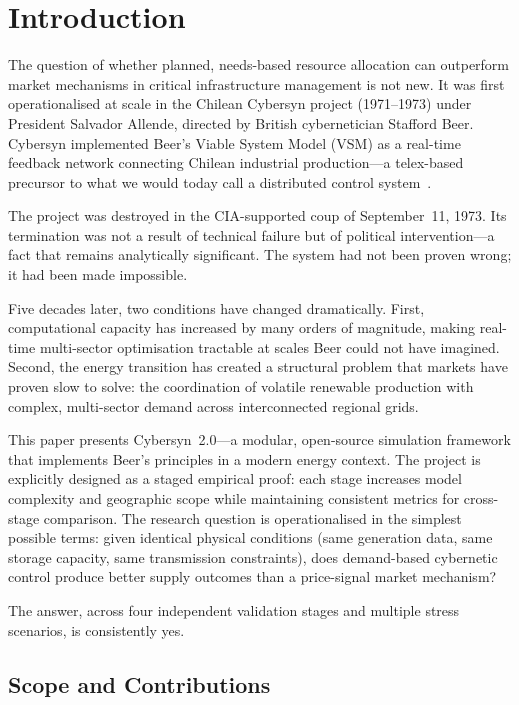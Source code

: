 \documentclass[12pt]{article}
\begin{document}
\section{Introduction}

The question of whether planned, needs-based resource allocation can outperform
market mechanisms in critical infrastructure management is not new.
It was first operationalised at scale in the Chilean Cybersyn project (1971--1973)
under President Salvador Allende, directed by British cybernetician Stafford Beer.
Cybersyn implemented Beer's Viable System Model (VSM) as a real-time feedback network
connecting Chilean industrial production---a telex-based precursor to what we would
today call a distributed control system~\citep{beer1972brain}.

The project was destroyed in the CIA-supported coup of September~11, 1973.
Its termination was not a result of technical failure but of political
intervention---a fact that remains analytically significant.
The system had not been proven wrong; it had been made impossible.

Five decades later, two conditions have changed dramatically.
First, computational capacity has increased by many orders of magnitude, making
real-time multi-sector optimisation tractable at scales Beer could not have imagined.
Second, the energy transition has created a structural problem that markets have
proven slow to solve: the coordination of volatile renewable production with complex,
multi-sector demand across interconnected regional grids.

This paper presents Cybersyn~2.0---a modular, open-source simulation framework that
implements Beer's principles in a modern energy context.
The project is explicitly designed as a staged empirical proof: each stage increases
model complexity and geographic scope while maintaining consistent metrics for
cross-stage comparison.
The research question is operationalised in the simplest possible terms: given
identical physical conditions (same generation data, same storage capacity, same
transmission constraints), does demand-based cybernetic control produce better supply
outcomes than a price-signal market mechanism?

The answer, across four independent validation stages and multiple stress scenarios,
is consistently yes.

\subsection{Scope and Contributions}
\end{document}
